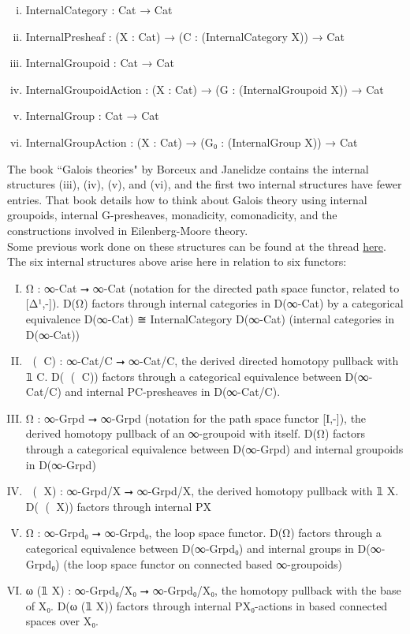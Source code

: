 \documentclass{book}
\theoremstyle{definition}
\begin{document}
\begin{enumerate}[(i)]
\item InternalCategory : Cat → Cat 
\item InternalPresheaf : (X : Cat) → (C : (InternalCategory X)) → Cat
\item InternalGroupoid : Cat → Cat
\item InternalGroupoidAction : (X : Cat) → (G : (InternalGroupoid X)) → Cat
\item InternalGroup : Cat → Cat
\item InternalGroupAction : (X : Cat) → (G₀ : (InternalGroup X)) → Cat   
\end{enumerate}

The book ``Galois theories" by Borceux and Janelidze contains the internal structures (iii), (iv), (v), and (vi), and the first two internal structures have fewer entries. That book details how to think about Galois theory using internal groupoids, internal G-presheaves, monadicity, comonadicity, and the constructions involved in Eilenberg-Moore theory.\\

Some previous work done on these structures can be found at the thread \href{https://leanprover.zulipchat.com/#narrow/stream/116395-maths/topic/Internal.20categories}{here}.\\

The six internal structures above arise here in relation to six functors:

\begin{enumerate}[(I)]
\item Ω⃗ : ∞-Cat ⭢ ∞-Cat (notation for the directed path space functor, related to [Δ¹,-]). D(Ω⃗) factors through internal categories in D(∞-Cat) by a categorical equivalence D(∞-Cat) ≅ InternalCategory D(∞-Cat) (internal categories in D(∞-Cat))
\item ω⃗ (𝟙 C) : ∞-Cat/C ⭢ ∞-Cat/C, the derived directed homotopy pullback with 𝟙 C. D(ω⃗ (𝟙 C)) factors through a categorical equivalence between D(∞-Cat/C) and internal P⃗C-presheaves in D(∞-Cat/C).
\item Ω⃡ : ∞-Grpd ⭢ ∞-Grpd (notation for the path space functor [I,-]), the derived homotopy pullback of an ∞-groupoid with itself. D(Ω⃡) factors through a categorical equivalence between D(∞-Grpd) and internal groupoids in D(∞-Grpd)
\item ω⃡ (𝟙 X) : ∞-Grpd/X ⭢ ∞-Grpd/X, the derived homotopy pullback with 𝟙 X. D(ω⃡ (𝟙 X)) factors through internal P⃡X
\item Ω : ∞-Grpd₀ ⭢ ∞-Grpd₀, the loop space functor. D(Ω) factors through a categorical equivalence between D(∞-Grpd₀) and internal groups in D(∞-Grpd₀) (the loop space functor on connected based ∞-groupoids)
\item ω (𝟙 X) : ∞-Grpd₀/X₀ ⭢ ∞-Grpd₀/X₀, the homotopy pullback with the base of X₀. D(ω (𝟙 X)) factors through internal PX₀-actions in based connected spaces over X₀.
\end{enumerate}
\end{document}
